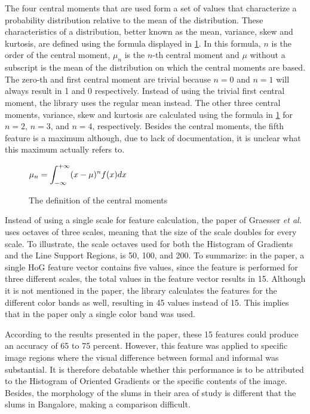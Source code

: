 The four central moments that are used form a set of values that characterize a probability distribution relative to the mean of the distribution. These characteristics of a distribution, better known as the mean, variance, skew and kurtosis, are defined using the formula displayed in \ref{central_moments}. In this formula, $n$ is the order of the central moment, $\mu_{n}$ is the $n$-th central moment and $\mu$ without a subscript is the mean of the distribution on which the central moments are based. The zero-th and first central moment are trivial because $n=0$ and $n=1$ will always result in 1 and 0 respectively. Instead of using the trivial first central moment, the library uses the regular mean instead. The other three central moments, variance, skew and kurtosis are calculated using the formula in \ref{central_moments} for $n=2$, $n=3$, and $n=4$, respectively. Besides the central moments, the fifth feature is a maximum although, due to lack of documentation, it is unclear what this maximum actually refers to.

\begin{figure}[h]
	\centering
	$\mathlarger{\mu_{n} = \int_{-\infty}^{+\infty} (x-\mu)^nf(x)dx} $
	\caption{The definition of the central moments}
	\label{central_moments}
\end{figure}

Instead of using a single scale for feature calculation, the paper of Graesser \textit{et al.} uses octaves of three scales, meaning that the size of the scale doubles for every scale. To illustrate, the scale octaves used for both the Histogram of Gradients and the Line Support Regions, is 50, 100, and 200. To summarize: in the paper, a single HoG feature vector contains five values, since the feature is performed for three different scales, the total values in the feature vector results in 15. Although it is not mentioned in the paper, the library calculates the features for the different color bands as well, resulting in 45 values instead of 15. This implies that in the paper only a single color band was used.

According to the results presented in the paper, these 15 features could produce an accuracy of 65 to 75 percent. However, this feature was applied to specific image regions where the visual difference between formal and informal was substantial. It is therefore debatable whether this performance is to be attributed to the Histogram of Oriented Gradients or the specific contents of the image. Besides, the morphology of the slums in their area of study is different that the slums in Bangalore, making a comparison difficult.



